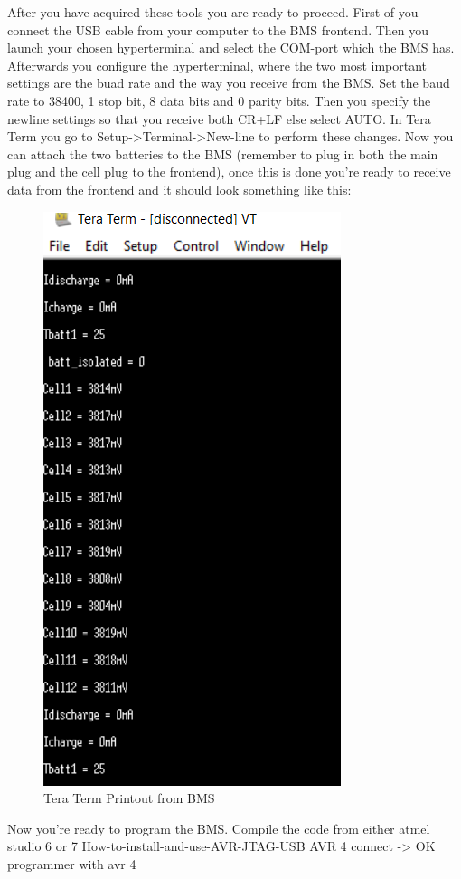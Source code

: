 After you have acquired these tools you are ready to proceed. First of you connect the USB cable from your computer to the BMS frontend. Then you launch your chosen hyperterminal and select the COM-port which the BMS has. Afterwards you configure the hyperterminal, where the two most important settings are the buad rate and the way you receive from the BMS. Set the baud rate to 38400, 1 stop bit, 8 data bits and 0 parity bits. Then you specify the newline settings so that you receive both CR+LF else select AUTO. In Tera Term you go to Setup->Terminal->New-line to perform these changes. 
Now you can attach the two batteries to the BMS (remember to plug in both the main plug and the cell plug to the frontend), once this is done you're ready to receive data from the frontend and it should look something like this: 
\begin{figure}[H]
	\centering
	\includegraphics[width=0.6\linewidth]{Hardware/Pictures/BMS_teraterm}
	\caption{Tera Term Printout from BMS}
	\label{fig:BMSTeraTerm}
\end{figure}

Now you're ready to program the BMS.
Compile the code from either atmel studio 6 or 7
How-to-install-and-use-AVR-JTAG-USB
AVR 4 connect -> OK
programmer with avr 4
